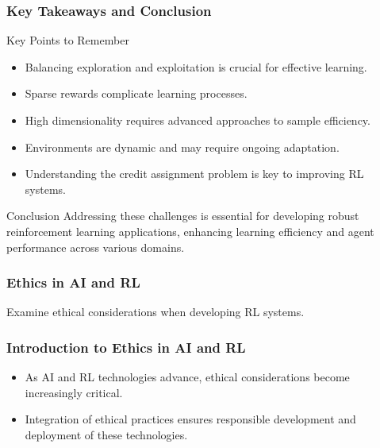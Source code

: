 \documentclass[aspectratio=169]{beamer}
\begin{document}
\begin{frame}[fragile]
    \frametitle{Key Takeaways and Conclusion}
    \begin{block}{Key Points to Remember}
        \begin{itemize}
            \item Balancing exploration and exploitation is crucial for effective learning.
            \item Sparse rewards complicate learning processes.
            \item High dimensionality requires advanced approaches to sample efficiency.
            \item Environments are dynamic and may require ongoing adaptation.
            \item Understanding the credit assignment problem is key to improving RL systems.
        \end{itemize}
    \end{block}

    \begin{block}{Conclusion}
        Addressing these challenges is essential for developing robust reinforcement learning applications, enhancing learning efficiency and agent performance across various domains.
    \end{block}
\end{frame}

\begin{frame}[fragile]
    \frametitle{Ethics in AI and RL}
    Examine ethical considerations when developing RL systems.
\end{frame}

\begin{frame}[fragile]
    \frametitle{Introduction to Ethics in AI and RL}
    \begin{itemize}
        \item As AI and RL technologies advance, ethical considerations become increasingly critical.
        \item Integration of ethical practices ensures responsible development and deployment of these technologies.
    \end{itemize}
\end{frame}
\end{document}

